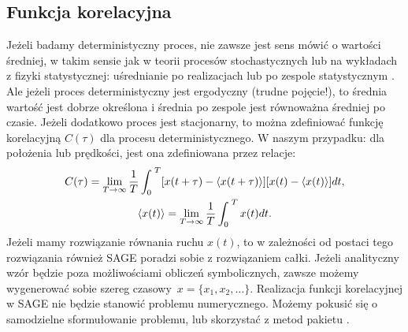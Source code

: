 \documentclass[a4paper,12pt,polish]{sphinxmanual}
\begin{document}
\subsection{Funkcja korelacyjna}
\label{ch2/chII012:funkcja-korelacyjna}
Jeżeli badamy deterministyczny proces, nie zawsze jest sens mówić o wartości średniej,  w takim sensie jak w teorii procesów stochastycznych lub na wykładach z fizyki statystycznej: uśrednianie po realizacjach lub po zespole statystycznym . Ale jeżeli proces deterministyczny jest ergodyczny (trudne pojęcie!), to średnia wartość jest dobrze określona i średnia po zespole  jest równoważna średniej po czasie.  Jeżeli dodatkowo  proces jest stacjonarny, to można zdefiniować funkcję korelacyjną $C(\tau)$  dla procesu deterministycznego. W naszym przypadku: dla położenia lub prędkości, jest ona zdefiniowana przez relacje:
\label{ch2/chII012:equation-eqn28}\begin{gather}
\begin{split}C(\tau) = \lim_{T\to \infty}   \frac{1}{T}   \int_0^{\; T}  [x(t+\tau) - \langle x(t+\tau)\rangle]  [ x(t) - \langle x(t)\rangle]  dt,\end{split}\label{ch2/chII012-eqn28}\\\begin{split}\langle x(t)\rangle = \lim_{T\to \infty}   \frac{1}{T}   \int_0^{\; T}   x(t)  dt.\end{split}\notag
\end{gather}
Jeżeli mamy rozwiązanie równania ruchu $x(t)$, to w zależności od postaci tego rozwiązania również SAGE poradzi sobie z rozwiązaniem całki. Jeżeli analityczny wzór będzie poza możliwościami obliczeń symbolicznych, zawsze możemy wygenerować sobie szereg czasowy $x = \{x_1, x_2, \dots \}$. Realizacja funkcji korelacyjnej w SAGE nie będzie stanowić problemu numerycznego. Możemy pokusić się o samodzielne sformułowanie problemu, lub skorzystać z metod pakietu .
\end{document}
